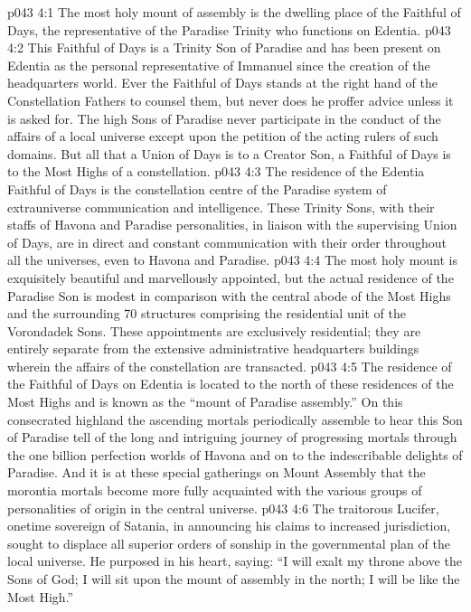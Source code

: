 \vs p043 4:1 The most holy mount of assembly is the dwelling place of the Faithful of Days, the representative of the Paradise Trinity who functions on Edentia.
\vs p043 4:2 This Faithful of Days is a Trinity Son of Paradise and has been present on Edentia as the personal representative of Immanuel since the creation of the headquarters world. Ever the Faithful of Days stands at the right hand of the Constellation Fathers to counsel them, but never does he proffer advice unless it is asked for. The high Sons of Paradise never participate in the conduct of the affairs of a local universe except upon the petition of the acting rulers of such domains. But all that a Union of Days is to a Creator Son, a Faithful of Days is to the Most Highs of a constellation.
\vs p043 4:3 The residence of the Edentia Faithful of Days is the constellation centre of the Paradise system of extrauniverse communication and intelligence. These Trinity Sons, with their staffs of Havona and Paradise personalities, in liaison with the supervising Union of Days, are in direct and constant communication with their order throughout all the universes, even to Havona and Paradise.
\vs p043 4:4 The most holy mount is exquisitely beautiful and marvellously appointed, but the actual residence of the Paradise Son is modest in comparison with the central abode of the Most Highs and the surrounding 70 structures comprising the residential unit of the Vorondadek Sons. These appointments are exclusively residential; they are entirely separate from the extensive administrative headquarters buildings wherein the affairs of the constellation are transacted.
\vs p043 4:5 The residence of the Faithful of Days on Edentia is located to the north of these residences of the Most Highs and is known as the “mount of Paradise assembly.” On this consecrated highland the ascending mortals periodically assemble to hear this Son of Paradise tell of the long and intriguing journey of progressing mortals through the one billion perfection worlds of Havona and on to the indescribable delights of Paradise. And it is at these special gatherings on Mount Assembly that the morontia mortals become more fully acquainted with the various groups of personalities of origin in the central universe.
\vs p043 4:6 The traitorous Lucifer, onetime sovereign of Satania, in announcing his claims to increased jurisdiction, sought to displace all superior orders of sonship in the governmental plan of the local universe. He purposed in his heart, saying: “I will exalt my throne above the Sons of God; I will sit upon the mount of assembly in the north; I will be like the Most High.”
